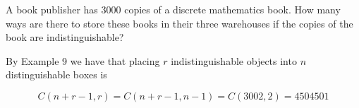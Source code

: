 \documentclass[../main.tex]{subfiles}
\begin{document}
A book publisher has 3000 copies of a discrete mathematics book. How many ways are there to store these books in their three warehouses if the copies of the book are indistinguishable?

\solution

By Example 9 we have that placing $r$ indistinguishable objects into $n$ distinguishable boxes is 

\[ C(n+r-1, r) = C(n+r-1, n-1) = C(3002, 2) = 4504501 \]
\end{document}
